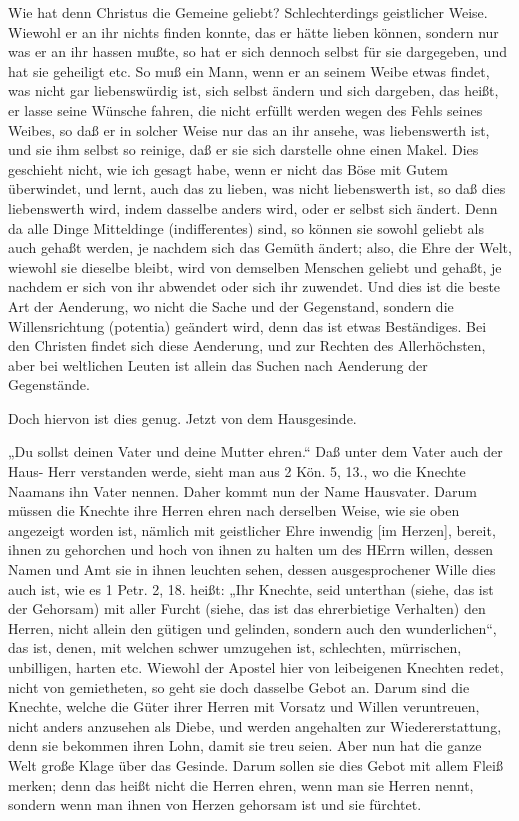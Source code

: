 Wie hat denn Christus die Gemeine geliebt? Schlechterdings geistlicher Weise. Wiewohl er an ihr nichts finden konnte, das er hätte lieben können, sondern nur was er an ihr hassen mußte, so hat er sich dennoch selbst für sie dargegeben, und hat sie geheiligt etc. So muß ein Mann, wenn er an seinem Weibe etwas findet, was nicht gar liebenswürdig ist, sich selbst ändern und sich dargeben, das heißt, er lasse seine Wünsche fahren, die nicht erfüllt werden wegen des Fehls seines Weibes, so daß er in solcher Weise nur das an ihr ansehe, was liebenswerth ist, und sie ihm selbst so reinige, daß er sie sich darstelle ohne einen Makel. Dies geschieht nicht, wie ich gesagt habe, wenn er nicht das Böse mit Gutem überwindet, und lernt, auch das zu lieben, was nicht liebenswerth ist, so daß dies liebenswerth wird, indem dasselbe anders wird, oder er selbst sich ändert. Denn da alle Dinge Mitteldinge (indifferentes) sind, so können sie sowohl geliebt als auch gehaßt werden, je nachdem sich das Gemüth ändert; also, die Ehre der Welt, wiewohl sie dieselbe bleibt, wird von demselben Menschen geliebt und gehaßt, je nachdem er sich von ihr abwendet oder sich ihr zuwendet. Und dies ist die beste Art der Aenderung, wo nicht die Sache und der Gegenstand, sondern die Willensrichtung (potentia) geändert wird, denn das ist etwas Beständiges. Bei den Christen findet sich diese Aenderung, und zur Rechten des Allerhöchsten, aber bei weltlichen Leuten ist allein das Suchen nach Aenderung der Gegenstände.

Doch hiervon ist dies genug. Jetzt von dem Hausgesinde.

„Du sollst deinen Vater und deine Mutter ehren.“ Daß unter dem Vater auch der Haus-
Herr verstanden werde, sieht man aus 2 Kön. 5, 13., wo die Knechte Naamans ihn Vater nennen. Daher kommt nun der Name Hausvater. Darum müssen die Knechte ihre Herren ehren nach derselben Weise, wie sie oben angezeigt worden ist, nämlich mit geistlicher Ehre inwendig [im Herzen], bereit, ihnen zu gehorchen und hoch von ihnen zu halten um des HErrn willen, dessen Namen und Amt sie in ihnen leuchten sehen, dessen ausgesprochener Wille dies auch ist, wie es 1 Petr. 2, 18. heißt: „Ihr Knechte, seid unterthan (siehe, das ist der Gehorsam) mit aller Furcht (siehe, das ist das ehrerbietige Verhalten) den Herren, nicht allein den gütigen und gelinden, sondern auch den wunderlichen“, das ist, denen, mit welchen schwer umzugehen ist, schlechten, mürrischen, unbilligen, harten etc. Wiewohl der Apostel hier von leibeigenen Knechten redet, nicht von gemietheten, so geht sie doch dasselbe Gebot an. Darum sind die Knechte, welche die Güter ihrer Herren mit Vorsatz und Willen veruntreuen, nicht anders anzusehen als Diebe, und werden angehalten zur Wiedererstattung, denn sie bekommen ihren Lohn, damit sie treu seien. Aber nun hat die ganze Welt große Klage über das Gesinde. Darum sollen sie dies Gebot mit allem Fleiß merken; denn das heißt nicht die Herren ehren, wenn man sie Herren nennt, sondern wenn man ihnen von Herzen gehorsam ist und sie fürchtet.


